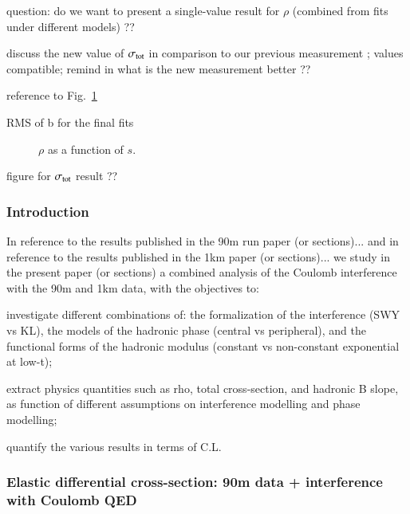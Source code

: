 \> question: do we want to present a single-value result for $\rho$ (combined from fits under different models) ??

\> discuss the new value of $\sigma_{\rm tot}$ in comparison to our previous measurement \cite{prl111}; values compatible; remind in what is the new measurement better ??

\> reference to Fig.~\ref{fig:rho_s}

\> RMS of b for the final fits

\begin{figure}
\begin{center}
\vspace*{3cm}
\vskip-3mm
\caption{$\rho$ as a function of $s$.}
\label{fig:rho_s}
\end{center}
\end{figure}

\> figure for $\sigma_{\rm tot}$ result ??





\subsubsection{Introduction}

In reference to the results published in the 90m run paper (or sections)... and in reference to the results published in the 1km paper (or sections)... we study in the present paper (or sections) a combined analysis of the Coulomb interference with the 90m and 1km data, with the objectives to:

\> investigate different combinations of: the formalization of the interference (SWY vs
KL), the models of the hadronic phase (central vs peripheral), and the functional
forms of the hadronic modulus (constant vs non-constant exponential at low-t);

\> extract physics quantities such as rho, total cross-section, and hadronic B slope, as
function of different assumptions on interference modelling and phase modelling;

\> quantify the various results in terms of C.L.


\subsubsection{Elastic differential cross-section: 90m data + interference with Coulomb QED}

